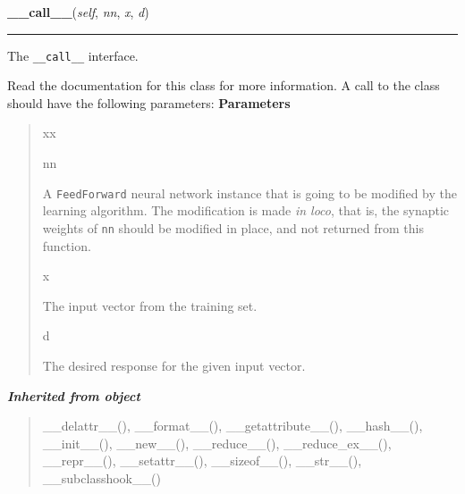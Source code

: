\hspace{.8\funcindent}\begin{boxedminipage}{\funcwidth}

    \raggedright \textbf{\_\_call\_\_}(\textit{self}, \textit{nn}, \textit{x}, \textit{d})

    \vspace{-1.5ex}

    \rule{\textwidth}{0.5\fboxrule}
\setlength{\parskip}{2ex}

The \texttt{\_\_call\_\_} interface.

Read the documentation for this class for more information. A call to
the class should have the following parameters:
\setlength{\parskip}{1ex}
      \textbf{Parameters}
      \vspace{-1ex}

      \begin{quote}
        \begin{Ventry}{xx}

          \item[nn]


A \texttt{FeedForward} neural network instance that is going to be
modified by the learning algorithm. The modification is made \emph{in
loco}, that is, the synaptic weights of \texttt{nn} should be modified
in place, and not returned from this function.
          \item[x]


The input vector from the training set.
          \item[d]


The desired response for the given input vector.
        \end{Ventry}

      \end{quote}

    \end{boxedminipage}


\large{\textbf{\textit{Inherited from object}}}

\begin{quote}
\_\_delattr\_\_(), \_\_format\_\_(), \_\_getattribute\_\_(), \_\_hash\_\_(), \_\_init\_\_(), \_\_new\_\_(), \_\_reduce\_\_(), \_\_reduce\_ex\_\_(), \_\_repr\_\_(), \_\_setattr\_\_(), \_\_sizeof\_\_(), \_\_str\_\_(), \_\_subclasshook\_\_()
\end{quote}


